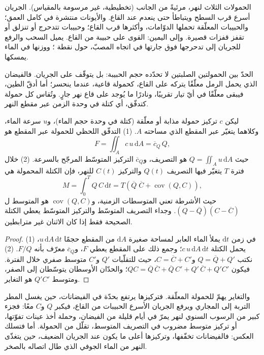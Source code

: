 \begin{omfigure}
{\small الحمولات الثلاث لنهر، مرئيةً من الجانب (تخطيطية، غير مرسومة بالمقياس). الجريان أسرع قرب السطح ويتباطأ حتى ينعدم عند القاع. والأيونات منتشرة في كامل العمق؛ والحبيبات المعلّقة تحملها الدوّامات، وأكثرها قرب القاع؛ وحبيبات  تتدحرج أو تنزلق أو تقفز قفزات قصيرة. وإلى اليمين: القوى على حبيبة من القاع. يميل السحب والرفع للجريان إلى تدحرجها فوق جارتها في اتجاه المصبّ، حول نقطة ؛ ووزنها في الماء يمسكها.}
\label{fig:b1:erosion-transport:loads}
\end{omfigure}

الحدّ بين الحمولتين الصلبتين لا تحدّده حجم الحبيبة: بل يتوقّف على الجريان. فالفيضان الذي يحمل الرمل معلّقًا يتركه على القاع، كحمولة قاعية، عندما ينحسر؛ أما أدقّ الطين، فيبقى معلّقًا في أيّ تيار تقريبًا، ونادرًا ما يُوجد على قاع نهر جارٍ. وتُقاس كل حمولة كتدفّق، أي كتلة في وحدة الزمن عبر مقطع النهر.

\begin{proposition}\label{prop:b1:erosion-transport:flux}
ليكن $c$ تركيز حمولة مذابة أو معلّقة (كتلة في وحدة حجم الماء)، و$u$ سرعة الماء، وكلاهما يتغيّر عبر المقطع الذي مساحته $A$. (1) التدفّق اللحظي للحمولة عبر المقطع هو
\[
  F = \iint_A c\,u\,\mathrm dA = \overline{c}_Q\,Q,
\]
حيث $Q = \iint_A u\,\mathrm dA$ هو التصريف، و$\overline{c}_Q$ التركيز المتوسّط المرجّح بالسرعة. (2) خلال فترة $T$ يتغيّر فيها التصريف $Q(t)$ والتركيز $C(t)$ للنهر، فإن الكتلة المحمولة هي
\[
  M = \int_0^T Q\,C\,\mathrm dt = T\left(\overline{Q}\;\overline{C} +
  \operatorname{cov}(Q, C)\right),
\]
حيث الأشرطة تعني المتوسطات الزمنية، و$\operatorname{cov}(Q, C)$ هو المتوسط ل$(Q - \overline{Q})(C - \overline{C})$. وجداء التصريف المتوسّط والتركيز المتوسّط يعطي الكتلة الصحيحة فقط إذا كان الاثنان غير مترابطين.
\end{proposition}

\begin{proof}
(1) في زمن $\mathrm dt$ يملأ الماء العابر لمساحة صغيرة $\mathrm dA$ من المقطع حجمًا $u\,\mathrm dA\,\mathrm dt$، يحمل الكتلة $c\,u\,\mathrm dA\,\mathrm dt$؛ وجمع ذلك على المقطع يعطي $F$، و$\overline{c}_Q$ معرّف بأنه $F/Q$. (2) نكتب $Q = \overline{Q} + Q'$ و$C =
\overline{C} + C'$، حيث للتقلّبات $Q'$ و$C'$ متوسط صفري خلال الفترة. فيكون $QC = \overline{Q}\,\overline{C} + \overline{Q}\,C' + Q'\,\overline{C}
+ Q'C'$؛ والحدّان الأوسطان يتوسّطان إلى الصفر، ومتوسط $Q'C'$ هو التغاير.
\end{proof}

والتغاير يهمّ للحمولة المعلّقة. فتركيزها يرتفع بحدّة في الفيضانات، حين يغسل المطر التربة إلى المجاري ويرفع الجريان الأسرع الحبيبات من القاع، فيكبر $Q$ و$C$ معًا: فجزء كبير من الرسوب السنوي لنهر يمرّ في أيام قليلة من الفيضان، وحملة أخذ عينات تفوّتها، أو تركيز متوسط مضروب في التصريف المتوسط، تقلّل من الحمولة. أما  فتسلك العكس: فالفيضانات تخفّفها، وتركيزها أعلى ما يكون عند الجريان الضعيف، حين يتغذّى النهر من الماء الجوفي الذي طال اتصاله بالصخر.

